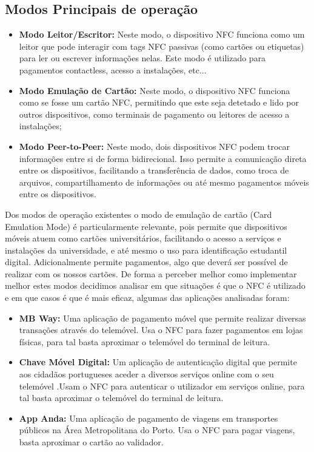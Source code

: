 \documentclass{article}
\begin{document}
\subsection{Modos Principais de operação}
\begin{itemize}
    \item \textbf{Modo Leitor/Escritor: } Neste modo, o dispositivo NFC funciona como um leitor que pode interagir com tags NFC passivas (como cartões ou etiquetas) para ler ou escrever informações nelas. Este modo é utilizado para pagamentos contactless, acesso a instalações, etc...
    \item \textbf{Modo Emulação de Cartão: } Neste modo, o dispositivo NFC funciona como se fosse um cartão NFC, permitindo que este seja detetado e lido por outros dispositivos, como terminais de pagamento ou leitores de acesso a instalações;
    \item \textbf{Modo Peer-to-Peer: } Neste modo, dois dispositivos NFC podem trocar informações entre si de forma bidirecional. Isso permite a comunicação direta entre os dispositivos, facilitando a transferência de dados, como troca de arquivos, compartilhamento de informações ou até mesmo pagamentos móveis entre os dispositivos.
\end{itemize}

Dos modos de operação existentes o modo de emulação de cartão (Card Emulation Mode) é particularmente relevante, pois permite que dispositivos móveis atuem
como cartões universitários, facilitando o acesso a serviços e instalações da universidade, e
até mesmo o uso para identificação estudantil digital. Adicionalmente permite pagamentos, algo que deverá ser possível de realizar com os nossos cartões.
De forma a perceber melhor como implementar melhor estes modos decidimos analisar em que situações é que o NFC é utilizado e em que casos é que é mais eficaz, algumas das aplicações analisadas foram:

\begin{itemize}
    \item \textbf{MB Way:} Uma aplicação de pagamento móvel que permite realizar diversas transações através do telemóvel. Usa o NFC para fazer pagamentos em lojas físicas, para tal basta aproximar o telemóvel do terminal de leitura.
    \item \textbf{Chave Móvel Digital:} Um aplicação de autenticação digital que permite aos cidadãos portugueses aceder a diversos serviços online com o seu telemóvel .Usam o NFC para autenticar o utilizador em serviços online, para tal basta aproximar o telemóvel do terminal de leitura.
    \item \textbf{App Anda:} Uma aplicação de pagamento de viagens em transportes públicos na Área Metropolitana do Porto. Usa o NFC para pagar viagens, basta aproximar o cartão ao validador.
\end{itemize}
\end{document}
